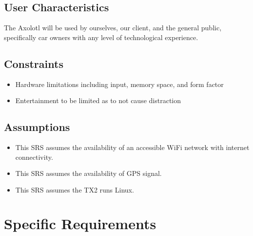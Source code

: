 \documentclass[onecolumn, draftclsnofoot,10pt, compsoc]{IEEEtran}
\begin{document}
\subsection{User Characteristics}
The Axolotl will be used by ourselves, our client, and the general public, specifically car owners with any level of technological experience.\par
\subsection{Constraints}
\begin{itemize}
	\item Hardware limitations including input, memory space, and form factor
	\item Entertainment to be limited as to not cause distraction
\end{itemize}
\subsection{Assumptions}
\begin{itemize}
	\item This SRS assumes the availability of an accessible WiFi network with internet connectivity.
	\item This SRS assumes the availability of GPS signal.
	\item This SRS assumes the TX2 runs Linux.
\end{itemize}
\section{Specific Requirements}
\end{document}
